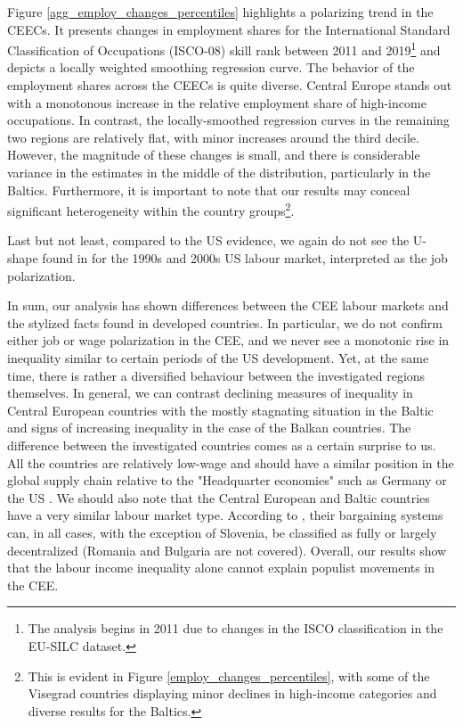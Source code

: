 \documentclass[11pt]{article}
\begin{document}
Figure \ref{agg_employ_changes_percentiles} highlights a polarizing trend in the CEECs. It presents changes in employment shares for the International Standard Classification of Occupations (ISCO-08) skill rank between 2011 and 2019\footnote{The analysis begins in 2011 due to changes in the ISCO classification in the EU-SILC dataset.} and depicts a locally weighted smoothing regression curve. The behavior of the employment shares across the CEECs is quite diverse. Central Europe stands out with a monotonous increase in the relative employment share of high-income occupations. In contrast, the locally-smoothed regression curves in the remaining two regions are relatively flat, with minor increases around the third decile. However, the magnitude of these changes is small, and there is considerable variance in the estimates in the middle of the distribution, particularly in the Baltics. Furthermore, it is important to note that our results may conceal significant heterogeneity within the country groups\footnote{This is evident in Figure \ref{employ_changes_percentiles}, with some of the Visegrad countries displaying minor declines in high-income categories and diverse results for the Baltics.}.

Last but not least, compared to the US evidence, we again do not see the  U-shape found in \citet{acemoglu2012does} for the 1990s and 2000s US labour market, interpreted as the job polarization.




In sum, our analysis has shown differences between the CEE labour markets and the stylized facts found in developed countries. In particular, we do not confirm either job or wage polarization in the CEE, and we never see a monotonic rise in inequality similar to certain periods of the US development. Yet, at the same time, there is rather a diversified behaviour between the investigated regions themselves. In general, we can contrast declining measures of inequality in Central European countries with the mostly stagnating situation in the Baltic and signs of increasing inequality in the case of the Balkan countries.
The difference between the investigated countries comes as a certain surprise to us. All the countries are relatively low-wage and should have a similar position in the global supply chain relative to the "Headquarter economies" such as Germany or the US \citep{baldwin2015supply}. We should also note that the Central European and Baltic countries have a very similar labour market type. According to \citet{/content/publication/1fd2da34-en}, their bargaining systems can, in all cases, with the exception of Slovenia, be classified as fully or largely decentralized (Romania and Bulgaria are not covered). Overall, our results show that the labour income inequality alone cannot explain populist movements in the CEE.
\end{document}
